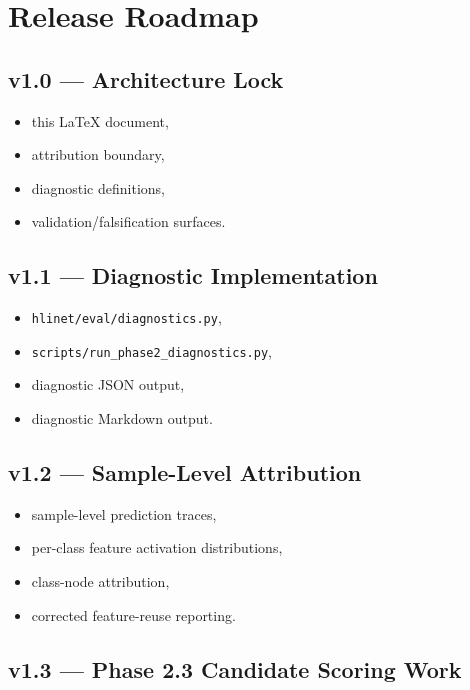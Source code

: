 \documentclass[12pt]{article}
\begin{document}
\section{Release Roadmap}

\subsection{v1.0 — Architecture Lock}

\begin{itemize}
\item this LaTeX document,
\item attribution boundary,
\item diagnostic definitions,
\item validation/falsification surfaces.
\end{itemize}

\subsection{v1.1 — Diagnostic Implementation}

\begin{itemize}
\item \texttt{hlinet/eval/diagnostics.py},
\item \texttt{scripts/run\_phase2\_diagnostics.py},
\item diagnostic JSON output,
\item diagnostic Markdown output.
\end{itemize}

\subsection{v1.2 — Sample-Level Attribution}

\begin{itemize}
\item sample-level prediction traces,
\item per-class feature activation distributions,
\item class-node attribution,
\item corrected feature-reuse reporting.
\end{itemize}

\subsection{v1.3 — Phase 2.3 Candidate Scoring Work}
\end{document}
